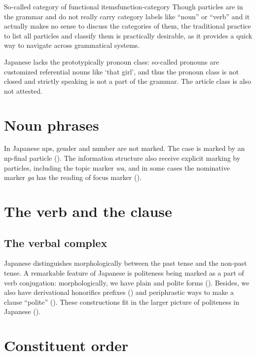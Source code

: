 \documentclass[UTF8, a4paper, oneside, scheme=plain]{ctexrep}
\newcommand{\corpus}[1]{\emph{#1}}
\newcommand{\translate}[1]{`#1'}
\begin{document}
\begin{theorybox}{So-called category of functional items}{function-category}
    Though particles are in the grammar and do not really carry category labels like ``noun'' or ``verb''
    and it actually makes no sense to discuss the categories of them,
    the traditional practice to list all particles and classify them 
    is practically desirable, 
    as it provides a quick way to navigate across grammatical systems.
\end{theorybox}

Japanese lacks the prototypically pronoun class:
so-called pronouns are customized referential nouns like \translate{that girl},
and thus the pronoun class is not closed and strictly speaking is not a part of the grammar.
The article class is also not attested.

\section{Noun phrases}

In Japanese \acs{np}s, gender and number are not marked.
The case is marked by an \ac{np}-final particle ().
The information structure also receive explicit marking by particles,
including the topic marker \corpus{wa}, 
and in some cases the nominative marker \corpus{ga} has the reading of focus marker
().

\section{The verb and the clause}

\subsection{The verbal complex}

Japanese distinguishes morphologically between the past tense and the non-past tense.
A remarkable feature of Japanese is politeness being marked as a part of verb conjugation:
morphologically, we have plain and polite forms ().
Besides, we also have derivational honorifics prefixes ()
and periphrastic ways to make a clause ``polite'' ().
These constructions fit in the larger picture of politeness in Japanese ().

\section{Constituent order}\label{sec:constituent-order}
\end{document}
